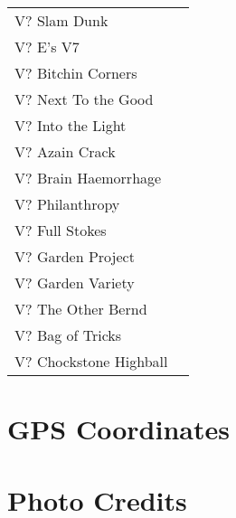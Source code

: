 \begin{center}
\begin{supertabular}{lr}
V? Slam Dunk & \pageref{rt:Slam Dunk} \\
V? E's V7 & \pageref{rt:E's V7} \\
V? Bitchin Corners & \pageref{rt:Bitchin Corners} \\
V? Next To the Good & \pageref{rt:Next To the Good} \\
V? Into the Light & \pageref{rt:Into the Light} \\
V? Azain Crack & \pageref{rt:Azain Crack} \\
V? Brain Haemorrhage & \pageref{rt:Brain Haemorrhage} \\
V? Philanthropy & \pageref{rt:Philanthropy} \\
V? Full Stokes & \pageref{rt:Full Stokes} \\
V? Garden Project & \pageref{rt:Garden Project} \\
V? Garden Variety & \pageref{rt:Garden Variety} \\
V? The Other Bernd & \pageref{rt:The Other Bernd} \\
V? Bag of Tricks & \pageref{rt:Bag of Tricks} \\
V? Chockstone Highball & \pageref{rt:Chockstone Highball} \\
\end{supertabular}
\end{center}
\section{GPS Coordinates}
\section{Photo Credits}